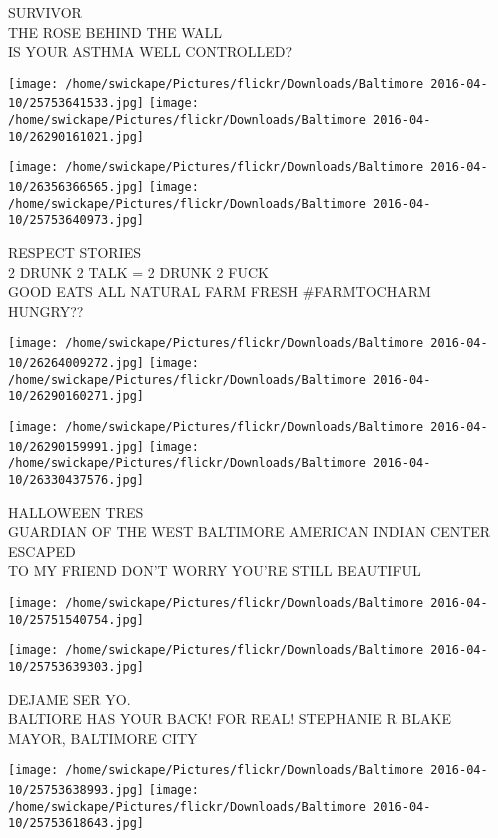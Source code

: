 \documentclass[10pt,letterpaper]{article}
\begin{document}
SURVIVOR\\
THE ROSE BEHIND THE WALL\\
IS YOUR ASTHMA WELL CONTROLLED?\\
\pagebreak

\texttt{[image: /home/swickape/Pictures/flickr/Downloads/Baltimore 2016-04-10/25753641533.jpg]}
\texttt{[image: /home/swickape/Pictures/flickr/Downloads/Baltimore 2016-04-10/26290161021.jpg]}

\texttt{[image: /home/swickape/Pictures/flickr/Downloads/Baltimore 2016-04-10/26356366565.jpg]}
\texttt{[image: /home/swickape/Pictures/flickr/Downloads/Baltimore 2016-04-10/25753640973.jpg]}

RESPECT STORIES\\
2 DRUNK 2 TALK = 2 DRUNK 2 FUCK\\
GOOD EATS ALL NATURAL FARM FRESH \#FARMTOCHARM\\
HUNGRY??\\
\pagebreak

\texttt{[image: /home/swickape/Pictures/flickr/Downloads/Baltimore 2016-04-10/26264009272.jpg]}
\texttt{[image: /home/swickape/Pictures/flickr/Downloads/Baltimore 2016-04-10/26290160271.jpg]}

\texttt{[image: /home/swickape/Pictures/flickr/Downloads/Baltimore 2016-04-10/26290159991.jpg]}
\texttt{[image: /home/swickape/Pictures/flickr/Downloads/Baltimore 2016-04-10/26330437576.jpg]}

HALLOWEEN TRES\\
GUARDIAN OF THE WEST BALTIMORE AMERICAN INDIAN CENTER\\
ESCAPED\\
TO MY FRIEND DON'T WORRY YOU'RE STILL BEAUTIFUL\\
\pagebreak

\texttt{[image: /home/swickape/Pictures/flickr/Downloads/Baltimore 2016-04-10/25751540754.jpg]}

\vspace{0.25in}
\texttt{[image: /home/swickape/Pictures/flickr/Downloads/Baltimore 2016-04-10/25753639303.jpg]}

DEJAME SER YO.\\
BALTIORE HAS YOUR BACK!  FOR REAL!  STEPHANIE R BLAKE MAYOR, BALTIMORE CITY\\
\pagebreak

\texttt{[image: /home/swickape/Pictures/flickr/Downloads/Baltimore 2016-04-10/25753638993.jpg]}
\texttt{[image: /home/swickape/Pictures/flickr/Downloads/Baltimore 2016-04-10/25753618643.jpg]}
\end{document}
